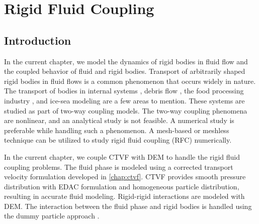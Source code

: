 \chapter{Rigid Fluid Coupling}
\label{chap:rfc}

\section{Introduction}
\label{sec:rfc:intro}
In the current chapter, we model the dynamics of rigid bodies in fluid flow and
the coupled behavior of fluid and rigid bodies. Transport of arbitrarily shaped
rigid bodies in fluid flows is a common phenomenon that occurs widely in nature.
The transport of bodies in internal systems \parencite{Dai2021}, debris flow
\parencite{Qingyun2022}, the food processing industry \parencite{Karunasena2014}, and
ice-sea modeling \parencite{Mintu2018} are a few areas to mention. These systems are
studied as part of two-way coupling models. The two-way coupling phenomena are
nonlinear, and an analytical study is not feasible. A numerical study is
preferable while handling such a phenomenon. A mesh-based or meshless technique
can be utilized to study rigid fluid coupling (RFC) numerically.


In the current chapter, we couple CTVF with DEM to handle the rigid fluid
coupling problems. The fluid phase is modeled using a corrected transport
velocity formulation developed in \cref{chap:ctvf}. CTVF provides smooth
pressure distribution with EDAC formulation and homogeneous particle
distribution, resulting in accurate fluid modeling. Rigid-rigid interactions are
modeled with DEM. The interaction between the fluid phase and rigid bodies is
handled using the dummy particle approach \parencite{Adami2012}.


\FloatBarrier%
